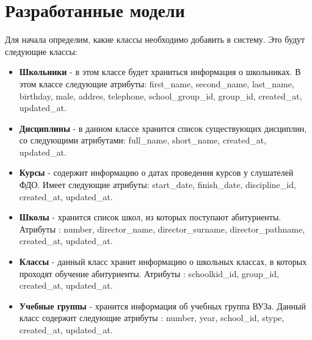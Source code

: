 \section{Разработанные модели}
\hspace*{0.5cm}Для начала определим, какие классы необходимо добавить в систему. Это будут следующие классы:\\
\begin{itemize}
\item \textbf{Школьники} - в этом классе будет храниться информация о школьниках. В этом классе следующие атрибуты: first\_name, second\_name, last\_name, birthday, male, addres, telephone, school\_group\_id, group\_id, created\_at, updated\_at.\\
\item \textbf{Дисциплины} - в данном классе хранится список существующих дисциплин, со следующими атрибутами: full\_name, short\_name, created\_at, updated\_at.\\
\item \textbf{Курсы} - содержит информацию о датах проведения курсов у слушателей ФДО. Имеет следующие атрибуты: start\_date, finish\_date, discipline\_id, created\_at, updated\_at.\\
\item \textbf{Школы} - хранится список школ, из которых поступают абитуриенты. Атрибуты : number, director\_name, director\_surname, director\_pathname, created\_at, updated\_at.\\
\item \textbf{Классы} - данный класс хранит информацию о школьных классах, в которых проходят обучение абитуриенты. Атрибуты : schoolkid\_id, group\_id, created\_at, updated\_at.\\
\item \textbf{Учебные группы} - хранится информация об учебных группа ВУЗа. Данный класс содержит следующие атрибуты : number, year, school\_id, stype, created\_at, updated\_at.\\
\end{itemize}
\endinput
